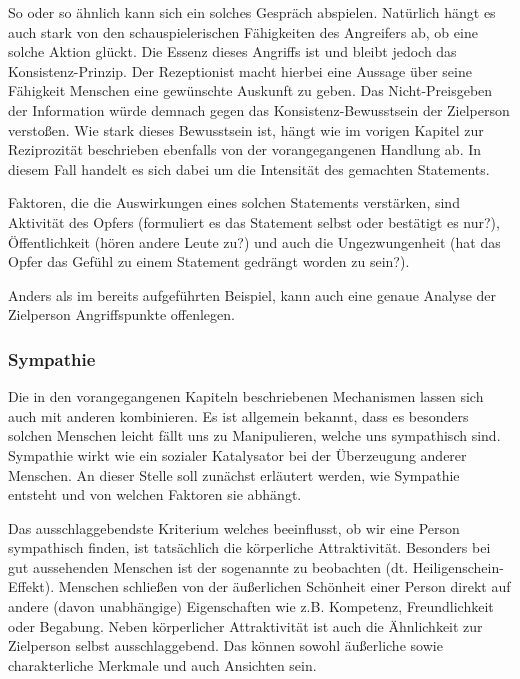 So oder so ähnlich kann sich ein solches Gespräch abspielen. Natürlich hängt es auch stark von den schauspielerischen Fähigkeiten des Angreifers ab, ob eine solche Aktion glückt.
Die Essenz dieses Angriffs ist und bleibt jedoch das Konsistenz-Prinzip. Der Rezeptionist macht hierbei eine Aussage über seine Fähigkeit Menschen eine gewünschte Auskunft zu geben. Das Nicht-Preisgeben der Information würde demnach gegen das Konsistenz-Bewusstsein der Zielperson verstoßen. Wie stark dieses Bewusstsein ist, hängt wie im vorigen Kapitel zur Reziprozität beschrieben ebenfalls von der vorangegangenen Handlung ab. In diesem Fall handelt es sich dabei um die Intensität des gemachten Statements.

Faktoren, die die Auswirkungen eines solchen Statements verstärken, sind Aktivität des Opfers (formuliert es das Statement selbst oder bestätigt es nur?), Öffentlichkeit (hören andere Leute zu?) und auch die Ungezwungenheit (hat das Opfer das Gefühl zu einem Statement gedrängt worden zu sein?). \citep{cialdini}

Anders als im bereits aufgeführten Beispiel, kann auch eine genaue Analyse der Zielperson Angriffspunkte offenlegen. %

\subsubsection{Sympathie}\label{sec:sympathie}
Die in den vorangegangenen Kapiteln beschriebenen Mechanismen lassen sich auch mit anderen  kombinieren. Es ist allgemein bekannt, dass es besonders solchen Menschen leicht fällt uns zu Manipulieren, welche uns sympathisch sind.
Sympathie wirkt wie ein sozialer Katalysator bei der Überzeugung anderer Menschen. 
An dieser Stelle soll zunächst erläutert werden, wie Sympathie entsteht und von welchen Faktoren sie abhängt.

Das ausschlaggebendste Kriterium welches beeinflusst, ob wir eine Person sympathisch finden, ist tatsächlich die körperliche Attraktivität. Besonders bei gut aussehenden Menschen ist der sogenannte  zu beobachten (dt. Heiligenschein-Effekt). Menschen schließen von der äußerlichen Schönheit einer Person direkt auf andere (davon unabhängige) Eigenschaften wie z.B. Kompetenz, Freundlichkeit
oder Begabung.
Neben körperlicher Attraktivität ist auch die Ähnlichkeit zur Zielperson selbst ausschlaggebend. Das können sowohl äußerliche sowie charakterliche Merkmale und auch Ansichten sein.

